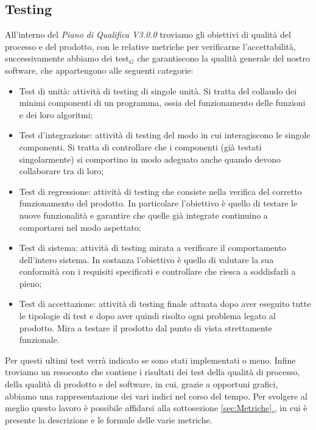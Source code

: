   \subsection{Testing}
  All'interno del \textit{Piano di Qualifica V3.0.0} troviamo gli obiettivi di qualità del processo e del prodotto, con le relative metriche per verificarne l'accettabilità, successivamente abbiamo dei test$_G$ che garantiscono la qualità generale del nostro software, che appartengono alle seguenti categorie:
  \begin{itemize}
      \item Test di unità: attività di testing di singole unità. Si tratta del collaudo dei minimi componenti di un programma, ossia del funzionamento delle funzioni e dei loro algoritmi;
      \item Test d'integrazione: attività di testing del modo in cui interagiscono le singole componenti. Si tratta di controllare che i componenti (già testati singolarmente) si comportino in modo adeguato anche quando devono collaborare tra di loro;
      \item Test di regressione: attività di testing che consiste nella verifica del corretto funzionamento del prodotto. In particolare l'obiettivo è quello di testare le nuove funzionalità e garantire che quelle già integrate continuino a comportarsi nel modo aspettato;
      \item Test di sistema: attività di testing mirata a verificare il comportamento dell'intero sistema. In sostanza l'obiettivo è quello di valutare la sua conformità con i requisiti specificati e controllare che riesca a soddisfarli a pieno;
      \item Test di accettazione: attività di testing finale attuata dopo aver eseguito tutte le tipologie di test e dopo aver quindi risolto ogni problema legato al prodotto. Mira a testare il prodotto dal punto di vista strettamente funzionale.
  \end{itemize}
  Per questi ultimi test verrà indicato se sono stati implementati o meno.
  \newline
  Infine troviamo un resoconto che contiene i risultati dei test della qualità di processo, della qualità di prodotto e del software, in cui, grazie a opportuni grafici, abbiamo una rappresentazione dei vari indici nel corso del tempo. Per svolgere al meglio questo lavoro è possibile affidarsi alla sottosezione \underline{\ref{sec:Metriche} }, in cui è presente la descrizione e le formule delle varie metriche.
